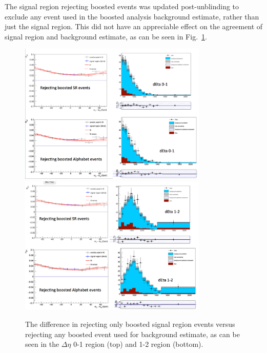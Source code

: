 The signal region rejecting boosted events was updated post-unblinding to exclude any event used in the boosted analysis background estimate, rather than just the signal region. This did not have an appreciable effect on the agreement of signal region and background estimate, as can be seen in Fig.~\ref{fig:twoboostcompare}.

\begin{figure}[h]
\centering
\includegraphics[width=0.8\textwidth]{F5/boostcompare1.pdf}\\
\includegraphics[width=0.8\textwidth]{F5/boostcompare2.pdf}
\caption{The difference in rejecting only boosted signal region events versus rejecting any boosted event used for background estimate, as can be seen in the $\Delta\eta$ 0-1 region (top) and 1-2 region (bottom).}
\label{fig:twoboostcompare}
\end{figure}